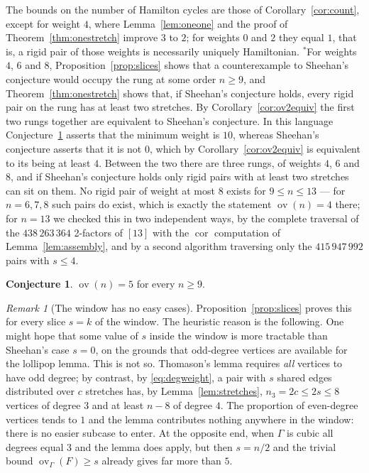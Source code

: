 \documentclass[11pt,a4paper]{article}
\theoremstyle{definition}
\newtheorem{conjecture}[theorem]{Conjecture}
\theoremstyle{remark}
\newtheorem{remark}[theorem]{Remark}
\newcommand{\ov}{\operatorname{ov}}
\newcommand{\cor}{\operatorname{cor}}
\begin{document}
The bounds on the number of Hamilton cycles are those of Corollary~\ref{cor:count}, except for weight $4$, where Lemma~\ref{lem:oneone} and the proof of Theorem~\ref{thm:onestretch} improve $3$ to $2$; for weights $0$ and $2$ they equal $1$, that is, a rigid pair of those weights is necessarily uniquely Hamiltonian. $^{*}$For weights $4$, $6$ and $8$, Proposition~\ref{prop:slices} shows that a counterexample to Sheehan's conjecture would occupy the rung at some order $n\ge9$, and Theorem~\ref{thm:onestretch} shows that, if Sheehan's conjecture holds, every rigid pair on the rung has at least two stretches. By Corollary~\ref{cor:ov2equiv} the first two rungs together are equivalent to Sheehan's conjecture. In this language Conjecture~\ref{conj:main} asserts that the minimum weight is $10$, whereas Sheehan's conjecture asserts that it is not $0$, which by Corollary~\ref{cor:ov2equiv} is equivalent to its being at least $4$. Between the two there are three rungs, of weights $4$, $6$ and $8$, and if Sheehan's conjecture holds only rigid pairs with at least two stretches can sit on them. No rigid pair of weight at most $8$ exists for $9\le n\le13$ --- for $n=6,7,8$ such pairs do exist, which is exactly the statement $\ov(n)=4$ there; for $n=13$ we checked this in two independent ways, by the complete traversal of the $438\,263\,364$ 2-factors of $[13]$ with the $\cor$ computation of Lemma~\ref{lem:assembly}, and by a second algorithm traversing only the $415\,947\,992$ pairs with $s\le4$.

\begin{conjecture}\label{conj:main}
$\ov(n)=5$ for every $n\ge9$.
\end{conjecture}

\begin{remark}[The window has no easy cases]\label{rem:noeasy}
Proposition~\ref{prop:slices} proves this for every slice $s=k$ of the window. The heuristic reason is the following. One might hope that some value of $s$ inside the window is more tractable than Sheehan's case $s=0$, on the grounds that odd-degree vertices are available for the lollipop lemma. This is not so. Thomason's lemma \cite{thomason78} requires \emph{all} vertices to have odd degree; by contrast, by \eqref{eq:degweight}, a pair with $s$ shared edges distributed over $c$ stretches has, by Lemma~\ref{lem:stretches}, $n_3=2c\le2s\le8$ vertices of degree $3$ and at least $n-8$ of degree $4$. The proportion of even-degree vertices tends to $1$ and the lemma contributes nothing anywhere in the window: there is no easier subcase to enter. At the opposite end, when $\Gamma$ is cubic all degrees equal $3$ and the lemma does apply, but then $s=n/2$ and the trivial bound $\ov_\Gamma(F)\ge s$ already gives far more than $5$.
\end{remark}
\end{document}

